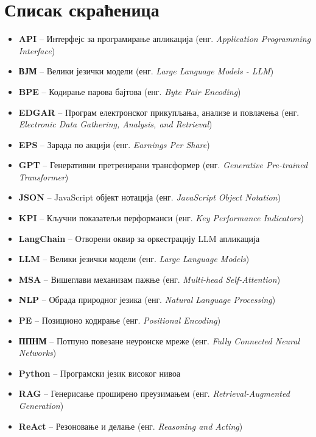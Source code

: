 \chapter{Списак скраћеница}

\begin{itemize}
    \item \textbf{API} -- Интерфејс за програмирање апликација (енг. \textit{Application Programming Interface})
    \item \textbf{ВЈМ} -- Велики језички модели (енг. \textit{Large Language Models - LLM})
    \item \textbf{BPE} -- Кодирање парова бајтова (енг. \textit{Byte Pair Encoding})
    \item \textbf{EDGAR} -- Програм електронског прикупљања, анализе и повлачења (енг. \textit{Electronic Data Gathering, Analysis, and Retrieval})
    \item \textbf{EPS} -- Зарада по акцији (енг. \textit{Earnings Per Share})
    \item \textbf{GPT} -- Генеративни претренирани трансформер (енг. \textit{Generative Pre-trained Transformer})
    \item \textbf{JSON} -- JavaScript објект нотација (енг. \textit{JavaScript Object Notation})
    \item \textbf{KPI} -- Кључни показатељи перформанси (енг. \textit{Key Performance Indicators})
    \item \textbf{LangChain} -- Отворени оквир за оркестрацију LLM апликација
    \item \textbf{LLM} -- Велики језички модели (енг. \textit{Large Language Models})
    \item \textbf{MSA} -- Вишеглави механизам пажње (енг. \textit{Multi-head Self-Attention})
    \item \textbf{NLP} -- Обрада природног језика (енг. \textit{Natural Language Processing})
    \item \textbf{PE} -- Позиционо кодирање (енг. \textit{Positional Encoding})
    \item \textbf{ППНМ} -- Потпуно повезане неуронске мреже (енг. \textit{Fully Connected Neural Networks})
    \item \textbf{Python} -- Програмски језик високог нивоа
    \item \textbf{RAG} -- Генерисање проширено преузимањем (енг. \textit{Retrieval-Augmented Generation})
    \item \textbf{ReAct} -- Резоновање и делање (енг. \textit{Reasoning and Acting})

\end{itemize}
